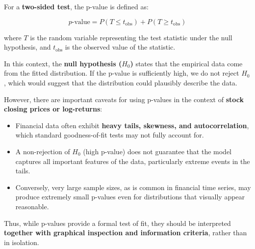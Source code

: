 \documentclass[
]{article}
\newenvironment{Shaded}{\begin{snugshade}}{\end{snugshade}}
\newcommand{\AttributeTok}[1]{\textcolor[rgb]{0.13,0.29,0.53}{#1}}
\newcommand{\FunctionTok}[1]{\textcolor[rgb]{0.13,0.29,0.53}{\textbf{#1}}}
\newcommand{\NormalTok}[1]{#1}
\newcommand{\OtherTok}[1]{\textcolor[rgb]{0.56,0.35,0.01}{#1}}
\newcommand{\SpecialCharTok}[1]{\textcolor[rgb]{0.81,0.36,0.00}{\textbf{#1}}}
\newcommand{\StringTok}[1]{\textcolor[rgb]{0.31,0.60,0.02}{#1}}
\providecommand{\tightlist}{%
  \setlength{\itemsep}{0pt}\setlength{\parskip}{0pt}}
\begin{document}
For a \textbf{two-sided test}, the p-value is defined as:

\[
p\text{-value} = P(T \leq t_\text{obs}) + P(T \geq t_\text{obs})
\]

where \(T\) is the random variable representing the test statistic under
the null hypothesis, and \(t_\text{obs}\) is the observed value of the
statistic.

In this context, the \textbf{null hypothesis (\(H_0\))} states that the
empirical data come from the fitted distribution. If the p-value is
sufficiently high, we do not reject \(H_0\), which would suggest that
the distribution could plausibly describe the data.

However, there are important caveats for using p-values in the context
of \textbf{stock closing prices or log-returns}:

\begin{itemize}
\tightlist
\item
  Financial data often exhibit \textbf{heavy tails, skewness, and
  autocorrelation}, which standard goodness-of-fit tests may not fully
  account for.\\
\item
  A non-rejection of \(H_0\) (high p-value) does not guarantee that the
  model captures all important features of the data, particularly
  extreme events in the tails.\\
\item
  Conversely, very large sample sizes, as is common in financial time
  series, may produce extremely small p-values even for distributions
  that visually appear reasonable.
\end{itemize}

Thus, while p-values provide a formal test of fit, they should be
interpreted \textbf{together with graphical inspection and information
criteria}, rather than in isolation.

\begin{Shaded}
\end{Shaded}
\end{document}
